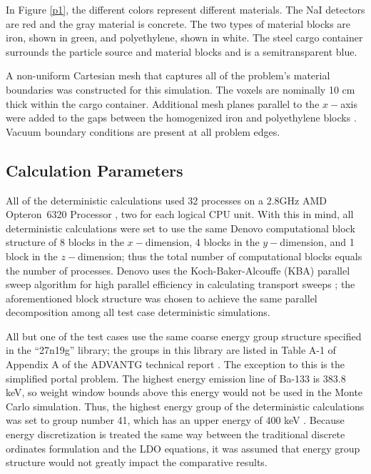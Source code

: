 \documentclass{article} %
\begin{document}
In Figure \ref{p1}, the different colors represent different materials. The NaI
detectors are red and the gray material is concrete. The two types of material
blocks are iron, shown in green, and polyethylene, shown in white. The steel
cargo container surrounds the particle source and material blocks and is a
semitransparent blue.

A non-uniform Cartesian mesh that captures all of the problem's material
boundaries was constructed for this simulation. The voxels are nominally 10 cm
thick within the cargo container. Additional mesh planes parallel to the
$x-$axis were added to the gaps between the homogenized iron and polyethylene
blocks \cite{advantg}. Vacuum boundary conditions are present at all problem
edges.

\subsection{Calculation Parameters}
\label{params}

All of the deterministic calculations used 32 processes on a 2.8GHz AMD 
Opteron\texttrademark\ 6320 Processor \cite{amd}, two for each logical CPU
unit. With this in mind, all deterministic calculations were set to use the
same Denovo computational block structure of 8 blocks in the $x-$dimension, 4
blocks in the $y-$dimension, and 1 block in the $z-$dimension;
thus the total number of computational blocks equals the number of processes.
Denovo uses the Koch-Baker-Alcouffe (KBA) parallel sweep algorithm for high
parallel efficiency in calculating transport sweeps \cite{denovo}; the
aforementioned block structure was chosen to achieve the same parallel
decomposition among all test case deterministic simulations. 

All but one of the test cases use the same coarse energy group structure
specified in the ``27n19g'' library; the groups in this library are listed in
Table A-1 of Appendix A of the ADVANTG technical report \cite{advantg}. The
exception to this is the simplified portal problem. The highest energy
emission line of Ba-133 is 383.8 keV, so weight window bounds above this
energy would not be used in the Monte Carlo simulation. Thus, the highest
energy group of the deterministic calculations was set to group number 41,
which has an upper energy of 400 keV \cite{advantg}. Because 
energy discretization is treated the same way between the traditional discrete 
ordinates formulation and the LDO equations, it was assumed that energy group 
structure would not greatly impact the comparative results.
\end{document}
